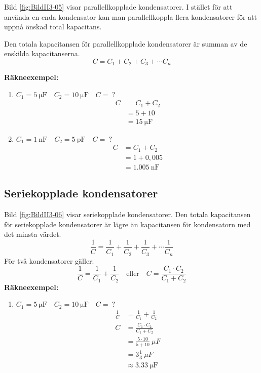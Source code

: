 
Bild \ref{fig:BildII3-05} visar parallellkopplade kondensatorer.
I stället för att använda en enda kondensator kan man parallellkoppla flera
kondensatorer för att uppnå önskad total kapacitans.

Den totala kapacitansen för parallellkopplade kondensatorer är summan av de
enskilda kapacitanserna.
%
\[
  C = C_1 + C_2 + C_3 + \cdots C_n
\]
%
\begin{minipage}{\columnwidth}
\textbf{Räkneexempel:}
\begin{enumerate}
\item \(C_1 = \SI{5}{\micro\farad} \quad C_2 = \SI{10}{\micro\farad} \quad C =\ ?\)
  \begin{align*}
    C &= C_1 + C_2 \\[1ex]
    &= 5 + 10 \\[1ex]
    &= \SI{15}{\micro\farad}
  \end{align*}
\item \(C_1 = \SI{1}{\nano\farad} \quad C_2 = \SI{5}{\pico\farad} \quad C =\ ?\)
  \begin{align*}
    C &= C_1 + C_2 \\[1ex]
    &= 1 + 0,005 \\[1ex]
    &= \SI{1,005}{\nano\farad}
  \end{align*}
\end{enumerate}
\end{minipage}

\subsection{Seriekopplade kondensatorer}
\label{seriekopplade_kondensatorer}


Bild \ref{fig:BildII3-06} visar seriekopplade kondensatorer.
Den totala kapacitansen för seriekopplade kondensatorer är lägre än kapacitansen
för kondensatorn med det minsta värdet.
%
\[
\frac{1}{C} = \frac{1}{C_1} + \frac{1}{C_2} +
\frac{1}{C_3} + \cdots \frac{1}{C_n}
\]
%
För två kondensatorer gäller:
\[
  \frac{1}{C} = \frac{1}{C_1} + \frac{1}{C_2} \quad \text{eller} \quad
  C = \frac{C_1 \cdot C_2}{C_1 + C_2}
\]
\noindent
\textbf{Räkneexempel:}
\begin{enumerate}
  \item \(C_1 = \SI{5}{\micro\farad} \quad C_2 = \SI{10}{\micro\farad} \quad C =\ ?\)
    \begin{align*}
      \frac{1}{C} &= \frac{1}{C_1} + \frac{1}{C_2} \\[1ex]
      C &= \frac{C_1 \cdot C_2}{C_1 + C_2} \\[1ex]
      &= \frac{5 \cdot 10}{5 + 10}\ \mu F \\[1ex]
      &= 3\frac{1}{3}\ \mu F \\[1ex]
      &\approx \SI{3,33}{\micro\farad}
    \end{align*}
\end{enumerate}

